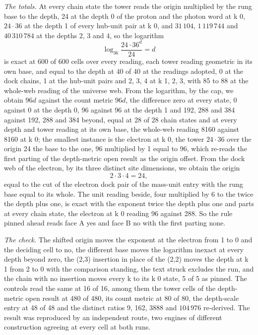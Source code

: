 \begin{chproof}
\textit{The totals.} At every chain state the tower reads the origin multiplied by the rung base to the depth, 24 at the depth 0 of the proton and the photon word at k 0, $24\cdot 36$ at the depth 1 of every hub-unit pair at k 0, and $31\,104$, $1\,119\,744$ and $40\,310\,784$ at the depths 2, 3 and 4, so the logarithm
\begin{equation}
\log_{36}\frac{24\cdot 36^{d}}{24} = d
\end{equation}
is exact at 600 of 600 cells over every reading, each tower reading geometric in its own base, and equal to the depth at 40 of 40 at the readings adopted, 0 at the dock chains, 1 at the hub-unit pairs and 2, 3, 4 at k 1, 2, 3, with 85 to 88 at the whole-web reading of the universe web. From the logarithm, by the cap, we obtain $96 d$ against the count metric $96 d$, the difference zero at every state, 0 against 0 at the depth 0, 96 against 96 at the depth 1 and 192, 288 and 384 against 192, 288 and 384 beyond, equal at 28 of 28 chain states and at every depth and tower reading at its own base, the whole-web reading 8160 against 8160 at k 0; the smallest instance is the electron at k 0, the tower $24\cdot 36$ over the origin 24 the base to the one, 96 multiplied by 1 equal to 96, which re-reads the first parting of the depth-metric open result as the origin offset. From the dock web of the electron, by its three distinct site dimensions, we obtain the origin
\begin{equation}
2\cdot 3\cdot 4 = 24,
\end{equation}
equal to the cut of the electron dock pair of the mass-unit entry with the rung base equal to its whole. The unit reading beside, four multiplied by 6 to the twice the depth plus one, is exact with the exponent twice the depth plus one and parts at every chain state, the electron at k 0 reading 96 against 288. So the rule pinned ahead reads face A yes and face B no with the first parting none.

\textit{The check.} The shifted origin moves the exponent at the electron from 1 to 0 and the deciding cell to no, the different base moves the logarithm inexact at every depth beyond zero, the (2,3) insertion in place of the (2,2) moves the depth at k 1 from 2 to 0 with the comparison standing, the text struck excludes the run, and the chain with no insertion moves every k to its k 0 state, 5 of 5 as pinned. The controls read the same at 16 of 16, among them the tower cells of the depth-metric open result at 480 of 480, its count metric at 80 of 80, the depth-scale entry at 48 of 48 and the distinct ratios 9, 162, 3888 and $104\,976$ re-derived. The result was reproduced by an independent route, two engines of different construction agreeing at every cell at both runs.
\end{chproof}
